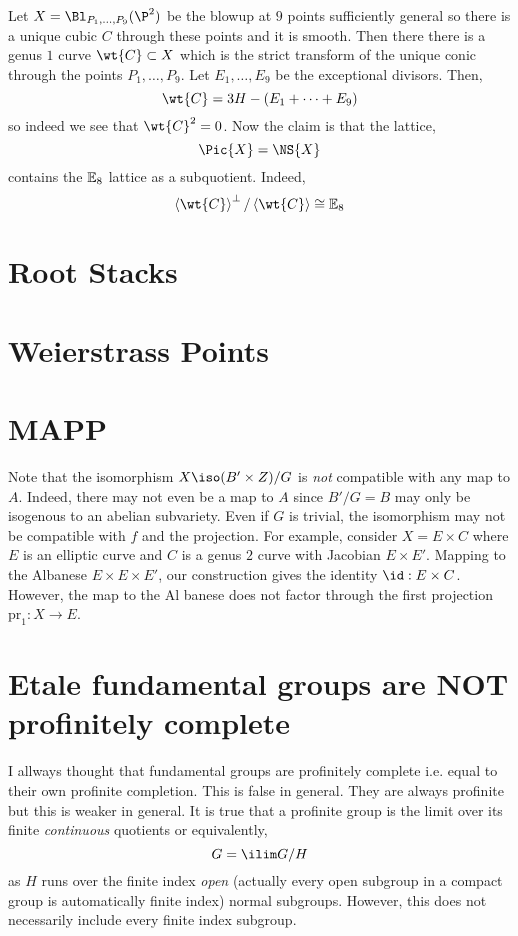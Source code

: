\documentclass[12pt]{article}
\newcommand{\pr}{\mathrm{pr}}
\begin{document}
Let $X = \Bl_{P_1, \dots, P_9}(\P^2)$ be the blowup at $9$ points sufficiently general so there is a unique cubic $C$ through these points and it is smooth. Then there there is a genus $1$ curve $\wt{C} \subset X$ which is the strict transform of the unique conic through the points $P_1, \dots, P_9$. Let $E_1, \dots, E_9$ be the exceptional divisors. Then,
\[ \wt{C} = 3 H - (E_1 + \cdots + E_9) \]
so indeed we see that $\wt{C}^2 = 0$. Now the claim is that the lattice,
\[ \Pic{X} = \NS{X} \]
contains the $\mathbb{E}_8$ lattice as a subquotient. Indeed,
\[ \left< \wt{C} \right>^\perp / \left< \wt{C} \right> \cong \bb{E}_8 \]

\section{Root Stacks}

\section{Weierstrass Points}



\section{MAPP}

\begin{remark}
Note that the isomorphism $X \iso (B' \times Z)/G$ is \textit{not} compatible with any map to $A$. Indeed, there may not even be a map to $A$ since $B'/G = B$ may only be isogenous to an abelian subvariety. Even if $G$ is trivial, the isomorphism may not be compatible with $f$ and the projection. For example, consider $X = E \times C$ where $E$ is an elliptic curve and $C$ is a genus $2$ curve with Jacobian $E \times E'$. Mapping to the Albanese $E \times E \times E'$, our construction gives the identity $\id : E \times C$. However, the map to the Al banese does not factor through the first projection $\pr_1 : X \to E$. 
\end{remark}


\section{Etale fundamental groups are NOT profinitely complete}

I allways thought that \etale fundamental groups are profinitely complete i.e. equal to their own profinite completion. This is false in general. They are always profinite but this is weaker in general. It is true that a profinite group is the limit over its finite \textit{continuous} quotients or equivalently,
\[ G = \ilim G/H \]
as $H$ runs over the finite index \textit{open} (actually every open subgroup in a compact group is automatically finite index) normal subgroups. However, this does not necessarily include every finite index subgroup.
\end{document}
